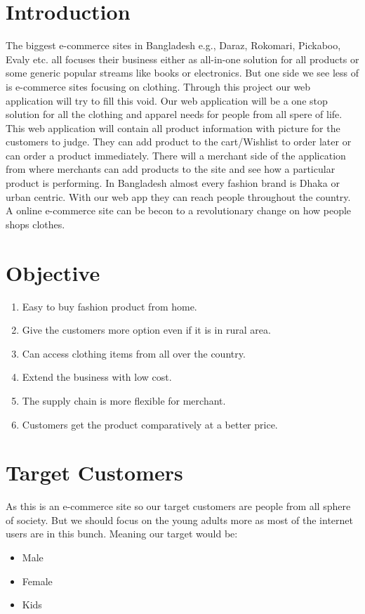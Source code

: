 \documentclass{article}
\begin{document}
\section{Introduction}

The biggest e-commerce sites in Bangladesh e.g., Daraz, Rokomari, Pickaboo, Evaly etc. all focuses their business either as all-in-one solution for all products or some generic popular streams like books or electronics. But one side we see less of is e-commerce sites focusing on clothing. Through this project our web application will try to fill this void. Our web application will be a one stop solution for all the clothing and apparel needs for people from all spere of life. This web application will contain all product information with picture for the customers to judge. They can add product to the cart/Wishlist to order later or can order a product immediately. There will a merchant side of the application from where merchants can add products to the site and see how a particular product is performing. In Bangladesh almost every fashion brand is Dhaka or urban centric. With our web app they can reach people throughout the country. A online e-commerce site can be becon to a revolutionary change on how people shops clothes.



\section{Objective}

\begin{enumerate}
\item Easy to buy fashion product from home.
\item Give the customers more option even if it is in rural area.
\item Can access clothing items from all over the country.
\item Extend the business with low cost. 
\item The supply chain is more flexible for merchant.
\item Customers get the product comparatively at a better price.
\end{enumerate}



\section{Target Customers}
As this is an e-commerce site so our target customers are people from all sphere of society. But we should focus on the young adults more as most of the internet users are in this bunch. 
Meaning our target would be:
\begin{itemize}
\item Male
\item Female
\item Kids

\end{itemize}
\end{document}
